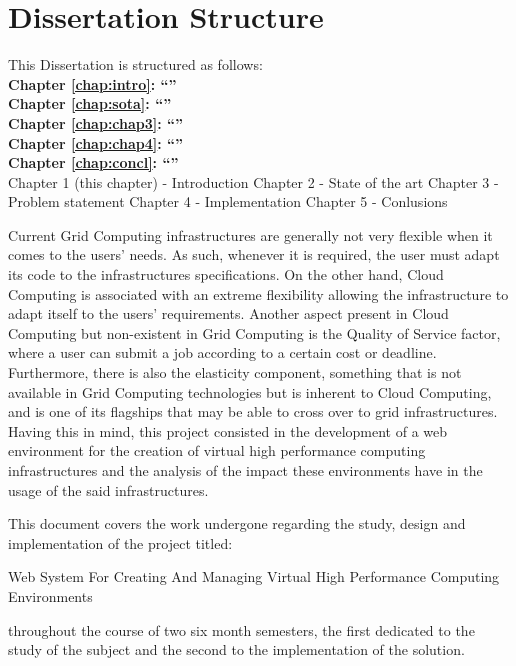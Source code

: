 \section{Dissertation Structure} \label{sec:structure}

This Dissertation is structured as follows:\\
\textbf{Chapter \ref{chap:intro}: ``'' }\\
\textbf{Chapter \ref{chap:sota}: ``'' }\\
\textbf{Chapter \ref{chap:chap3}: ``'' }\\
\textbf{Chapter \ref{chap:chap4}: ``'' }\\
\textbf{Chapter \ref{chap:concl}: ``'' }\\
Chapter 1 (this chapter) - Introduction
Chapter 2 - State of the art
Chapter 3 - Problem statement
Chapter 4 - Implementation
Chapter 5 - Conlusions

Current Grid Computing infrastructures are generally not very flexible when it comes to the users' needs. As such, whenever it is required, the user must adapt its code to the infrastructures specifications.
On the other hand, Cloud Computing is associated with an extreme flexibility allowing the infrastructure to adapt itself to the users' requirements. Another aspect present in Cloud Computing but non-existent in Grid Computing is the Quality of Service factor, where a user can submit a job according to a certain cost or deadline.
Furthermore, there is also the elasticity component, something that is not available in Grid Computing technologies but is inherent to Cloud Computing, and is one of its flagships that may be able to cross over to grid infrastructures.
Having this in mind, this project consisted in the development of a web environment for the creation of virtual high performance computing infrastructures and the analysis of the impact these environments have in the usage of the said infrastructures.

This document covers the work undergone regarding the study, design and implementation of the project titled:

Web System For Creating And Managing Virtual High Performance Computing Environments

throughout the course of two six month semesters, the first dedicated to the study of the subject and the second to the implementation of the solution.
